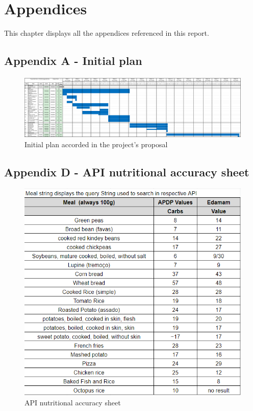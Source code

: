 %
%

\chapter{Appendices}

This chapter displays all the appendices referenced in this report.

\begin{landscape}
    \appendix    
    \section*{Appendix A - Initial plan}
    \label{app:initial_plan}
    \vspace{20mm}
    \begin{figure}[H]        
        \includegraphics[scale=0.3]{_figures/Project_initial_plan.eps}
        \caption{Initial plan accorded in the project's proposal}
    \end{figure}  
\end{landscape}

\appendix


\begin{landscape}
    \appendix
    
\end{landscape}

\appendix
\section*{Appendix D - API nutritional accuracy sheet}
\label{app:nutritional_sheet}
\begin{figure}[H] 
    \begin{center}
        \includegraphics[scale=1]{_figures/api_nutritional_accuracy.png}
        \caption{API nutritional accuracy sheet}
    \end{center}       
\end{figure}
